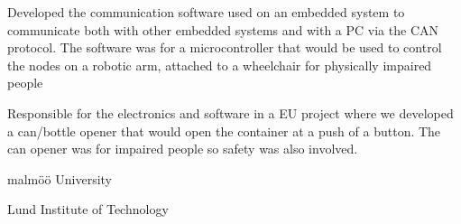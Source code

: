 \documentclass{article}
\begin{document}
{Developed the communication software used on an embedded system to communicate
  both with other  embedded systems and with a PC via the CAN protocol.
  The software was for a microcontroller that would be used to control the
  nodes on a robotic arm, attached to a wheelchair for physically impaired
  people} 
\sepspace

{Responsible for the electronics and software in a EU project where we
  developed a can/bottle opener that would open the container at a push of a
  button. The can opener was for impaired people so safety was also involved.}



{}	
\sepspace

{}	
\sepspace

{}	
\sepspace

{malm\"{o}ö University}
{}
\sepspace

{}	
\sepspace

{Lund Institute of Technology} {}
\end{document}
